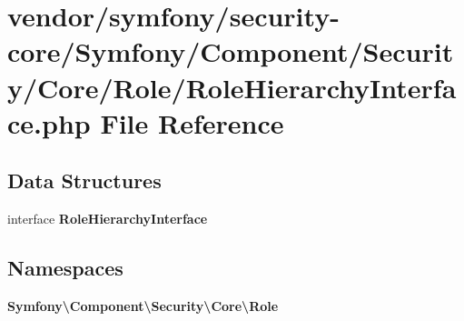 \section{vendor/symfony/security-\/core/\+Symfony/\+Component/\+Security/\+Core/\+Role/\+Role\+Hierarchy\+Interface.php File Reference}
\label{_role_hierarchy_interface_8php}
\subsection*{Data Structures}
\begin{DoxyCompactItemize}
\item 
interface {\bf Role\+Hierarchy\+Interface}
\end{DoxyCompactItemize}
\subsection*{Namespaces}
\begin{DoxyCompactItemize}
\item 
 {\bf Symfony\textbackslash{}\+Component\textbackslash{}\+Security\textbackslash{}\+Core\textbackslash{}\+Role}
\end{DoxyCompactItemize}
